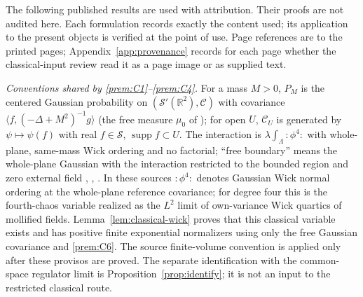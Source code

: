 \documentclass[11pt]{article}
\theoremstyle{plain}
\theoremstyle{definition}
\theoremstyle{remark}
\newcommand{\R}{\mathbb{R}}
\newcommand{\cC}{\mathcal{C}}
\newcommand{\cS}{\mathcal{S}}
\DeclareMathOperator{\supp}{supp}
\begin{document}
The following published results are used with attribution. Their proofs are
not audited here. Each formulation records exactly the content used; its
application to the present objects is verified at the point of use. Page
references are to the printed pages; Appendix~\ref{app:provenance} records for
each page whether the classical-input review read it as a page image or as
supplied text.

\emph{Conventions shared by \ref{prem:C1}--\ref{prem:C4}.} For a mass $M>0$,
$P_M$ is the centered Gaussian probability on $(\cS'(\R^{2}),\cC)$ with covariance
$\langle f,(-\Delta+M^{2})^{-1}g\rangle$ (the free measure $\mu_0$ of
\cite[p.~496]{FS1977}); for open $U$, $\cC_U$ is generated by $\psi\mapsto\psi(f)$
with real $f\in\cS$, $\supp f\subset U$. The interaction is
$\lambda\int_\Lambda{:}\phi^{4}{:}$ with whole-plane, same-mass Wick ordering and no
factorial; ``free boundary'' means the whole-plane Gaussian with the interaction
restricted to the bounded region and zero external field
\cite[pp.~496--497]{FS1977}, \cite[(4), p.~685]{AHKZ1989},
\cite[(IX.5a), pp.~311--312]{GRS1976}. In these sources ${:}\phi^{4}{:}$ denotes
Gaussian Wick normal ordering at the whole-plane reference covariance; for
degree four this is the fourth-chaos variable realized as the $L^{2}$ limit of
own-variance Wick quartics of mollified fields. Lemma~\ref{lem:classical-wick}
proves that this classical variable exists and has positive finite exponential
normalizers using only the free Gaussian covariance and \ref{prem:C6}. The
source finite-volume convention is applied only after these provisos are
proved. The separate identification with the common-space regulator limit
is Proposition~\ref{prop:identify}; it is not an input to the restricted
classical route.
\end{document}
